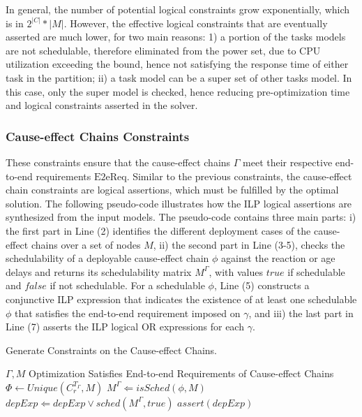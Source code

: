 In general, the number of potential logical constraints grow exponentially, which is in $2^{|C|}*|M|$. However, the effective logical constraints that are eventually asserted are much lower, for two main reasons: 1) a portion of the tasks models are not schedulable, therefore eliminated from the power set, due to CPU utilization exceeding the bound, hence not satisfying the response time of either task in the partition; ii) a task model can be a super set of other tasks model. In this case, only the super model is checked, hence reducing pre-optimization time and logical constraints asserted in the solver.

\subsubsection*{Cause-effect Chains Constraints}
These constraints ensure that the cause-effect chains $\Gamma$ meet their respective end-to-end requirements $\mathrm{E2eReq}$. Similar to the previous constraints, the cause-effect chain constraints are logical assertions, which must be fulfilled by the optimal solution. The following pseudo-code illustrates how the ILP logical assertions are synthesized from the input models. 
The pseudo-code contains three main parts: i) the first part in Line (2) identifies the different deployment cases of the cause-effect chains over a set of nodes $M$, ii) the second part in Line (3-5), checks the schedulability of a deployable cause-effect chain $\phi$ against the reaction or age delays  \cite{mubeen2013support} and returns its schedulability matrix $M^\Gamma$, with values $true$ if schedulable and $false$ if not schedulable. For a schedulable $\phi$, Line (5) constructs a conjunctive ILP expression that indicates the existence of at least one schedulable $\phi$ that satisfies the end-to-end requirement imposed on $\gamma$, and iii) the last part in Line (7) asserts the ILP logical OR expressions for each $\gamma$.
\begin{algorithm}
\caption{Generate Constraints on the Cause-effect Chains.}\label{alg_causeeffectchains}
\begin{algorithmic}[1]
\Require $\Gamma,M$
\Ensure Optimization Satisfies End-to-end Requirements of Cause-effect Chains
\ForAll{$\gamma \in \Gamma$}
\State $\Phi\leftarrow Unique(C^{T_\Gamma}_r, M)$ 
	\ForAll{$\phi \in \Phi$}
    \State $M^\Gamma\Leftarrow isSched(\phi, M)$
    \State $depExp\Leftarrow depExp \lor sched(M^\Gamma, true)$
    \EndFor
	\State $assert(depExp)$
\EndFor
\end{algorithmic}
\end{algorithm}\vspace{-0.2cm}

